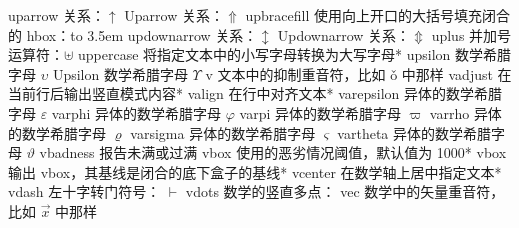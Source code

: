 \capcs uparrow {关系：$\uparrow$}{}{}
\capcs Uparrow {关系：$\Uparrow$}{}{}
\capcs upbracefill {使用向上开口的大括号填充闭合的 hbox：\hbox to 3.5em{\upbracefill}}{}{}
\capcs updownarrow {关系：$\updownarrow$}{}{}
\capcs Updownarrow {关系：$\Updownarrow$}{}{}
\capcs uplus {并加号运算符：$\uplus$}{}{}
\capcs uppercase {将指定文本中的小写字母转换为大写字母}*{}
\capcs upsilon {数学希腊字母 $\upsilon$}{}{}
\capcs Upsilon {数学希腊字母 $\Upsilon$}{}{}
\capcs v {文本中的抑制重音符，比如 \v o 中那样}{}{}
\capcs vadjust {在当前行后输出竖直模式内容}*{}
\capcs valign {在行中对齐文本}*{}
\capcs varepsilon {异体的数学希腊字母 $\varepsilon$}{}{}
\capcs varphi {异体的数学希腊字母 $\varphi$}{}{}
\capcs varpi {异体的数学希腊字母 $\varpi$}{}{}
\capcs varrho {异体的数学希腊字母 $\varrho$}{}{}
\capcs varsigma {异体的数学希腊字母 $\varsigma$}{}{}
\capcs vartheta {异体的数学希腊字母 $\vartheta$}{}{}
\capcs vbadness {报告未满或过满 vbox 使用的恶劣情况阈值，默认值为 1000}*{}
\capcs vbox {输出 vbox，其基线是闭合的底下盒子的基线}*{}
\capcs vcenter {在数学轴上居中指定文本}*{}
\capcs vdash {左十字转门符号： $\vdash$}{}{}
\capcs vdots {数学的竖直多点：\smash{$\vdots$}}{}{}
\capcs vec {数学中的矢量重音符，比如 $\vec x$ 中那样}{}{}
